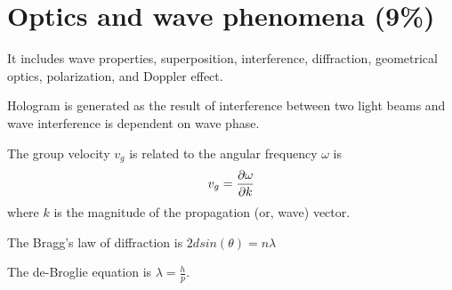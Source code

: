 
\section{Optics and wave phenomena (9\%)}

It includes wave properties, superposition, interference, diffraction, geometrical optics, polarization, and Doppler effect.


Hologram is generated as the result of interference between two light beams and wave interference is dependent on wave phase.

The group velocity $v_{g}$ is related to the angular frequency $\omega$ is \begin{align}
v_{g} = \pdv{\omega}{k}
\end{align}
where $k$ is the magnitude of the propagation (or, wave) vector.

The Bragg's law of diffraction is $2d sin(\theta) = n\lambda $

The de-Broglie equation is $\lambda = \frac{h}{p}$.
